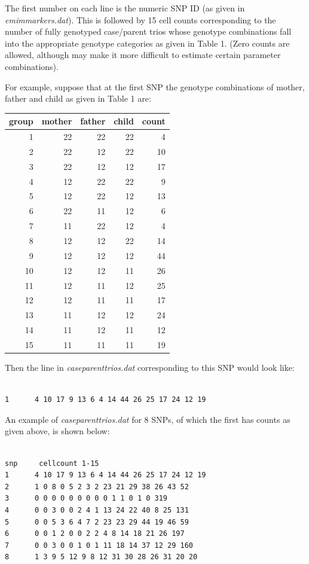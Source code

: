 \documentclass[a4paper,12pt]{article}
\begin{document}
The first number on each line is the numeric SNP ID (as given in {\it emimmarkers.dat}). This is followed by 15 cell counts corresponding to the number of fully genotyped case/parent trios whose genotype combinations fall into the appropriate genotype categories as given in \citet{ainsworth:etal:11} Table 1. (Zero counts are allowed, although may make it more difficult to estimate certain parameter combinations). 

For example, suppose that at the first SNP the genotype combinations of mother, father and child as given in \citet{ainsworth:etal:11} Table 1 are: 

{\begin{center}\begin{tabular}{rrrrr}
group  & mother  & father  & child  & count\\
\hline
1  & 22  & 22  & 22  & 4\\
2  & 22  & 12  & 22  & 10\\
3  & 22  & 12  & 12  & 17\\
4  & 12  & 22  & 22  & 9\\
5  & 12  & 22  & 12  & 13\\
6  & 22  & 11  & 12  & 6\\
7  & 11  & 22  & 12  & 4\\
8  & 12  & 12  & 22  & 14\\
9  & 12  & 12  & 12  & 44\\
10  & 12  & 12  & 11  & 26\\
11  & 12  & 11  & 12  & 25\\
12  & 12  & 11  & 11  & 17\\
13  & 11  & 12  & 12  & 24\\
14  & 11  & 12  & 11  & 12\\
15  & 11  & 11  & 11  & 19\\
\end{tabular}\end{center}}

Then the line in {\it caseparenttrios.dat} corresponding to this SNP would look like: 
\vspace{0.35cm} \begin{lstlisting}

1      4 10 17 9 13 6 4 14 44 26 25 17 24 12 19

\end{lstlisting} \vspace{0.35cm}
An example of {\it caseparenttrios.dat} for 8 SNPs, of which the first has counts as given above, is shown below: 
\vspace{0.35cm} \begin{lstlisting}

snp     cellcount 1-15
1      4 10 17 9 13 6 4 14 44 26 25 17 24 12 19
2      1 0 8 0 5 2 3 2 23 21 29 38 26 43 52
3      0 0 0 0 0 0 0 0 0 1 1 0 1 0 319
4      0 0 3 0 0 2 4 1 13 24 22 40 8 25 131
5      0 0 5 3 6 4 7 2 23 23 29 44 19 46 59
6      0 0 1 2 0 0 2 2 4 8 14 18 21 26 197
7      0 0 3 0 0 1 0 1 11 18 14 37 12 29 160
8      1 3 9 5 12 9 8 12 31 30 28 26 31 20 20

\end{lstlisting} \vspace{0.35cm}
\end{document}
